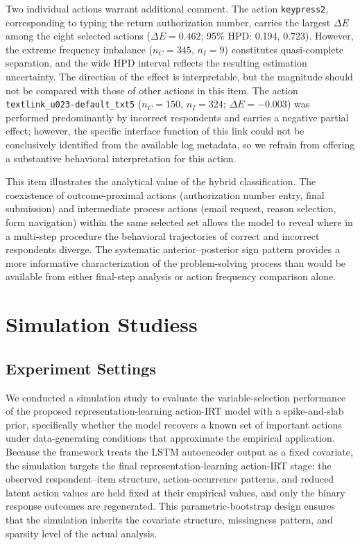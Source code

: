 \documentclass[A4paper,11pt]{article}
\begin{document}
Two individual actions warrant additional comment. The action \texttt{keypress2}, corresponding to typing the return authorization number, carries the largest $\Delta E$ among the eight selected actions ($\Delta E = 0.462$; 95\% HPD: 0.194, 0.723). However, the extreme frequency imbalance ($n_C = 345$, $n_I = 9$) constitutes quasi-complete separation, and the wide HPD interval reflects the resulting estimation uncertainty. The direction of the effect is interpretable, but the magnitude should not be compared with those of other actions in this item. The action \texttt{textlink\_u023-default\_txt5} ($n_C = 150$, $n_I = 324$; $\Delta E = -0.003$) was performed predominantly by incorrect respondents and carries a negative partial effect; however, the specific interface function of this link could not be conclusively identified from the available log metadata, so we refrain from offering a substantive behavioral interpretation for this action.

This item illustrates the analytical value of the hybrid classification. The coexistence of outcome-proximal actions (authorization number entry, final submission) and intermediate process actions (email request, reason selection, form navigation) within the same selected set allows the model to reveal where in a multi-step procedure the behavioral trajectories of correct and incorrect respondents diverge. The systematic anterior--posterior sign pattern provides a more informative characterization of the problem-solving process than would be available from either final-step analysis or action frequency comparison alone.

\section{Simulation Studiess}

\subsection{Experiment Settings}

We conducted a simulation study to evaluate the variable-selection performance of the proposed representation-learning action-IRT model with a spike-and-slab prior, specifically whether the model recovers a known set of important actions under data-generating conditions that approximate the empirical application. Because the framework treats the LSTM autoencoder output as a fixed covariate, the simulation targets the final representation-learning action-IRT stage: the observed respondent--item structure, action-occurrence patterns, and reduced latent action values are held fixed at their empirical values, and only the binary response outcomes are regenerated. This parametric-bootstrap design ensures that the simulation inherits the covariate structure, missingness pattern, and sparsity level of the actual analysis.
\end{document}
